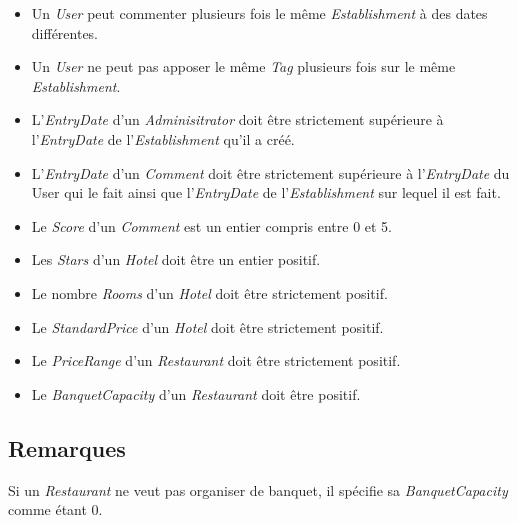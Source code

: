 \documentclass[11pt,a4paper]{report}
\begin{document}
\begin{itemize}
\item Un \textit{User} peut commenter plusieurs fois le même \textit{Establishment} à des dates différentes. 
\item Un \textit{User} ne peut pas apposer le même \textit{Tag} plusieurs fois sur le même \textit{Establishment}.
\item L'\textit{EntryDate} d'un \textit{Adminisitrator} doit être strictement supérieure à l'\textit{EntryDate} de l'\textit{Establishment} qu'il a créé.
\item L'\textit{EntryDate} d'un \textit{Comment} doit être strictement supérieure à l'\textit{EntryDate} du User qui le fait ainsi que l'\textit{EntryDate} de l'\textit{Establishment} sur lequel il est fait. 
\item Le \textit{Score} d'un \textit{Comment} est un entier compris entre 0 et 5.
\item Les \textit{Stars} d'un \textit{Hotel} doit être un entier positif.
\item Le nombre \textit{Rooms} d'un \textit{Hotel} doit être strictement positif. 
\item Le \textit{StandardPrice} d'un \textit{Hotel} doit être strictement positif. 
\item Le \textit{PriceRange} d'un \textit{Restaurant} doit être strictement positif. 
\item Le \textit{BanquetCapacity} d'un \textit{Restaurant} doit être positif. 
\end{itemize}
\subsection*{Remarques}
Si un \textit{Restaurant} ne veut pas organiser de banquet, il spécifie sa \textit{BanquetCapacity} comme étant 0.
\end{document}

